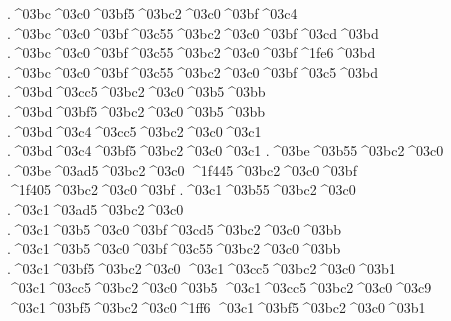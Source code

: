 {.^^^^03bc^^^^03c0^^^^03bf5^^^^03bc2^^^^03c0^^^^03bf^^^^03c4
.^^^^03bc^^^^03c0^^^^03bf^^^^03c55^^^^03bc2^^^^03c0^^^^03bf^^^^03cd^^^^03bd %
.^^^^03bc^^^^03c0^^^^03bf^^^^03c55^^^^03bc2^^^^03c0^^^^03bf^^^^1fe6^^^^03bd 
.^^^^03bc^^^^03c0^^^^03bf^^^^03c55^^^^03bc2^^^^03c0^^^^03bf^^^^03c5^^^^03bd 
.^^^^03bd^^^^03cc5^^^^03bc2^^^^03c0^^^^03b5^^^^03bb   %
.^^^^03bd^^^^03bf5^^^^03bc2^^^^03c0^^^^03b5^^^^03bb    
.^^^^03bd^^^^03c4^^^^03cc5^^^^03bc2^^^^03c0^^^^03c1   %
.^^^^03bd^^^^03c4^^^^03bf5^^^^03bc2^^^^03c0^^^^03c1
.^^^^03be^^^^03b55^^^^03bc2^^^^03c0      %
.^^^^03be^^^^03ad5^^^^03bc2^^^^03c0
^^^^1f445^^^^03bc2^^^^03c0^^^^03bf     %
^^^^1f405^^^^03bc2^^^^03c0^^^^03bf
.^^^^03c1^^^^03b55^^^^03bc2^^^^03c0      %
.^^^^03c1^^^^03ad5^^^^03bc2^^^^03c0     %
.^^^^03c1^^^^03b5^^^^03c0^^^^03bf^^^^03cd5^^^^03bc2^^^^03c0^^^^03bb %
.^^^^03c1^^^^03b5^^^^03c0^^^^03bf^^^^03c55^^^^03bc2^^^^03c0^^^^03bb  %
.^^^^03c1^^^^03bf5^^^^03bc2^^^^03c0      %
^^^^03c1^^^^03cc5^^^^03bc2^^^^03c0^^^^03b1     %
^^^^03c1^^^^03cc5^^^^03bc2^^^^03c0^^^^03b5
^^^^03c1^^^^03cc5^^^^03bc2^^^^03c0^^^^03c9
^^^^03c1^^^^03bf5^^^^03bc2^^^^03c0^^^^1ff6
^^^^03c1^^^^03bf5^^^^03bc2^^^^03c0^^^^03b1
}
